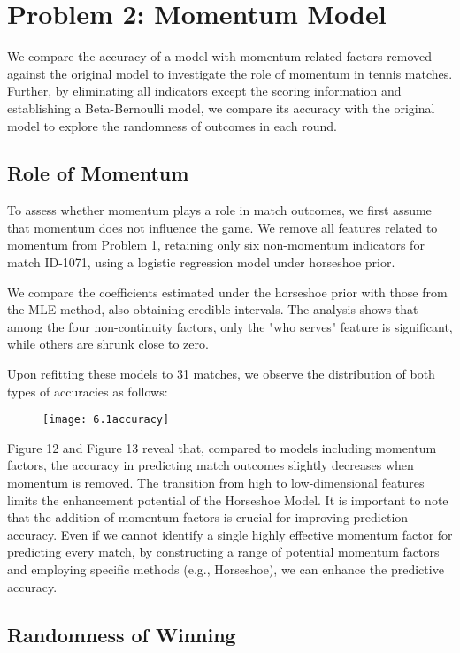 \documentclass{mcmthesis}
\begin{document}
\section{Problem 2: Momentum Model}

We compare the accuracy of a model with momentum-related factors removed against the original model to investigate the role of momentum in tennis matches. Further, by eliminating all indicators except the scoring information and establishing a Beta-Bernoulli model, we compare its accuracy with the original model to explore the randomness of outcomes in each round.

\subsection{Role of Momentum}

To assess whether momentum plays a role in match outcomes, we first assume that momentum does not influence the game. We remove all features related to momentum from Problem 1, retaining only six non-momentum indicators for match ID-1071, using a logistic regression model under horseshoe prior.

We compare the coefficients estimated under the horseshoe prior with those from the MLE method, also obtaining credible intervals. The analysis shows that among the four non-continuity factors, only the "who serves" feature is significant, while others are shrunk close to zero.

Upon refitting these models to 31 matches, we observe the distribution of both types of accuracies as follows:

\begin{figure}[ht]%
  \small
  \centering
  \texttt{[image: 6.1accuracy]}
\end{figure}

Figure 12 and Figure 13 reveal that, compared to models including momentum factors, the accuracy in predicting match outcomes slightly decreases when momentum is removed. The transition from high to low-dimensional features limits the enhancement potential of the Horseshoe Model. It is important to note that the addition of momentum factors is crucial for improving prediction accuracy. Even if we cannot identify a single highly effective momentum factor for predicting every match, by constructing a range of potential momentum factors and employing specific methods (e.g., Horseshoe), we can enhance the predictive accuracy.

\newpage
\subsection{Randomness of Winning}
\end{document}
